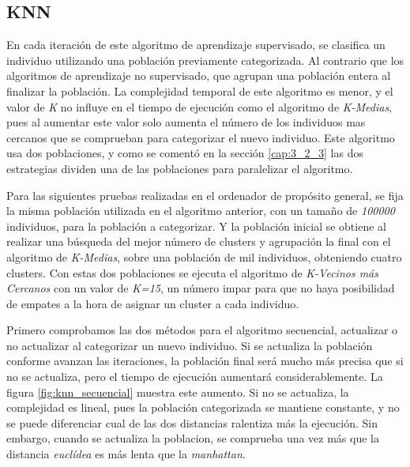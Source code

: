 	\subsection{KNN}


		En cada iteración de este algoritmo de aprendizaje supervisado, se clasifica un individuo utilizando una población previamente categorizada. Al contrario que los algoritmos de aprendizaje no supervisado, que agrupan una población entera al finalizar la población. La complejidad temporal de este algoritmo es menor, y el valor de \textit{K} no influye en el tiempo de ejecución como el algoritmo de \textit{K-Medias}, pues al aumentar este valor solo aumenta el número de los individuos mas cercanos que se comprueban para categorizar el nuevo individuo. Este algoritmo usa dos poblaciones, y como se comentó en la sección \ref{cap:3_2_3} las dos estrategias dividen una de las poblaciones para paralelizar el algoritmo. 
		
			Para las siguientes pruebas realizadas en el ordenador de propósito general, se fija la misma población utilizada en el algoritmo anterior, con un tamaño de \textit{100000} individuos, para la población a categorizar. Y la población inicial se obtiene al realizar una búsqueda del mejor número de clusters y agrupación la final con el algoritmo de \textit{K-Medias}, sobre una población de mil individuos, obteniendo cuatro clusters. Con estas dos poblaciones se ejecuta el algoritmo de \textit{K-Vecinos más Cercanos} con un valor de \textit{K=15}, un número impar para que no haya posibilidad de empates a la hora de asignar un cluster a cada individuo.
			
		
			Primero comprobamos las dos métodos para el algoritmo secuencial, actualizar o no actualizar al categorizar un nuevo individuo. Si se actualiza la población conforme avanzan las iteraciones, la población final será mucho más precisa que si no se actualiza, pero el tiempo de ejecución aumentará considerablemente. La figura \ref{fig:knn_secuencial} muestra este aumento. Si no se actualiza, la complejidad es lineal, pues la población categorizada se mantiene constante, y no se puede diferenciar cual de las dos distancias ralentiza más la ejecución. Sin embargo, cuando se actualiza la poblacion, se comprueba una vez más que la distancia \textit{euclídea} es más lenta que la \textit{manhattan}.
			
